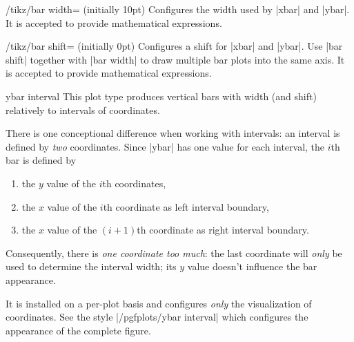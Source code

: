 \begin{key}{/tikz/bar width= (initially 10pt)}
	Configures the width used by |xbar| and |ybar|. It is accepted to provide mathematical expressions.
\end{key}

\begin{key}{/tikz/bar shift= (initially 0pt)}
	Configures a shift for |xbar| and |ybar|. Use |bar shift| together with |bar width| to draw multiple bar plots into the same axis. It is accepted to provide mathematical expressions.
\end{key}


\begin{plottype}{ybar interval}
	This plot type produces vertical bars with width (and shift) relatively to intervals of coordinates.

	There is one conceptional difference when working with intervals: an interval is defined by \emph{two} coordinates. Since |ybar| has one value for each interval, the $i$th bar is defined by
	\begin{enumerate}
		\item the $y$ value of the $i$th coordinates,
		\item the $x$ value of the $i$th coordinate as left interval boundary,
		\item the $x$ value of the $(i+1)$th coordinate as right interval boundary.
	\end{enumerate}
	Consequently, there is \emph{one coordinate too much}: the last coordinate will \emph{only} be used to determine the interval width; its $y$ value doesn't influence the bar appearance.

	It is installed on a per-plot basis and configures \emph{only} the visualization of coordinates. See the style |/pgfplots/ybar interval| which configures the appearance of the complete figure.
\begin{codeexample}[]
\end{codeexample}

\begin{codeexample}[]
\end{codeexample}


\end{plottype}
